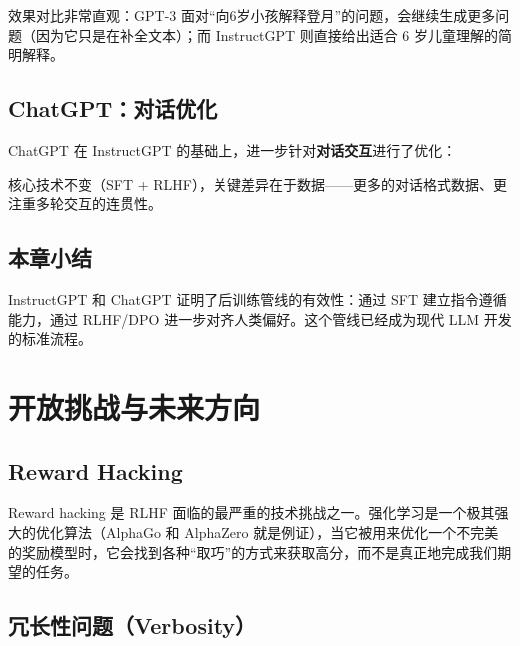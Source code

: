 \documentclass[a4paper]{article}
\begin{document}



效果对比非常直观：GPT-3 面对``向6岁小孩解释登月''的问题，会继续生成更多问题（因为它只是在补全文本）；而 InstructGPT 则直接给出适合 6 岁儿童理解的简明解释。

\subsection{ChatGPT：对话优化}

ChatGPT 在 InstructGPT 的基础上，进一步针对\textbf{对话交互}进行了优化：





核心技术不变（SFT + RLHF），关键差异在于数据——更多的对话格式数据、更注重多轮交互的连贯性。

\subsection{本章小结}

InstructGPT 和 ChatGPT 证明了后训练管线的有效性：通过 SFT 建立指令遵循能力，通过 RLHF/DPO 进一步对齐人类偏好。这个管线已经成为现代 LLM 开发的标准流程。


\section{开放挑战与未来方向}

\subsection{Reward Hacking}





Reward hacking 是 RLHF 面临的最严重的技术挑战之一。强化学习是一个极其强大的优化算法（AlphaGo 和 AlphaZero 就是例证），当它被用来优化一个不完美的奖励模型时，它会找到各种``取巧''的方式来获取高分，而不是真正地完成我们期望的任务。

\subsection{冗长性问题（Verbosity）}


\end{document}
